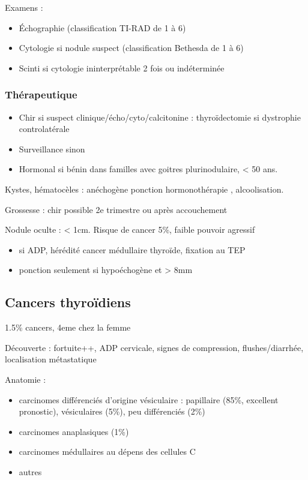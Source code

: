 \documentclass[11pt]{article}
\begin{document}
Examens : 
\begin{itemize}
\item Échographie (classification TI-RAD de 1 à 6)
\item Cytologie si nodule suspect (classification Bethesda de 1 à 6)
\item Scinti si cytologie ininterprétable 2 fois ou indéterminée
\end{itemize}

\subsubsection{Thérapeutique}
\label{sec:orgc2c2473}
\begin{itemize}
\item Chir si suspect clinique/écho/cyto/calcitonine \inc\inc{} : thyroïdectomie si dystrophie controlatérale
\item Surveillance sinon
\item Hormonal si bénin dans familles avec goitres plurinodulaire, < 50 ans.
\end{itemize}

Kystes, hématocèles : anéchogène \thus ponction \textpm{} hormonothérapie , alcoolisation.

Grossesse : chir possible 2e trimestre ou après accouchement 

Nodule oculte : < 1cm. Risque de cancer 5\%, faible pouvoir agressif
\begin{itemize}
\item \danger si ADP, hérédité cancer médullaire thyroïde, fixation au TEP
\item ponction seulement si hypoéchogène et > 8mm
\end{itemize}
\subsection{Cancers thyroïdiens}
\label{sec:org12a5f5e}
1.5\% cancers, 4eme chez la femme

Découverte : fortuite++, ADP cervicale, signes de compression, flushes/diarrhée,
localisation métastatique

Anatomie :
\begin{itemize}
\item carcinomes différenciés d'origine vésiculaire : papillaire (85\%, excellent
pronostic), vésiculaires (5\%), peu différenciés (2\%)
\item carcinomes anaplasiques (1\%)
\item carcinomes médullaires au dépens des cellules C
\item autres
\end{itemize}
\end{document}
